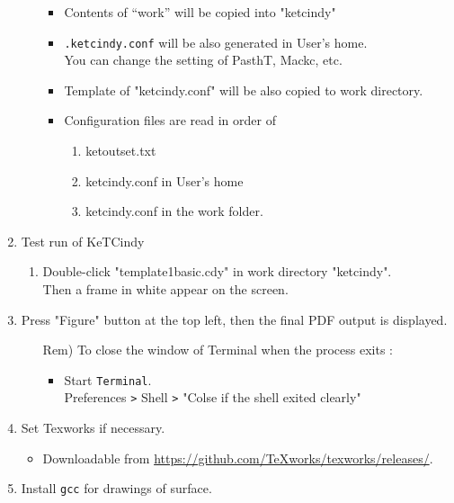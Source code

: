 \documentclass{article}
\begin{document}
\begin{enumerate}[\bf\large 1.]
\begin{enumerate}[(1)]
\begin{itemize}
    \item Contents of “work” will be copied into "ketcindy"
    \item \verb|.ketcindy.conf| will be also generated in User's home.\\
    \hspace*{10mm}You can change the setting of PasthT, Mackc, etc.
    \item Template of "ketcindy.conf" will be also copied to work directory.
    \item Configuration files are read in order of 
      \begin{enumerate}[1)]
      \item ketoutset.txt
      \item ketcindy.conf in User's home
      \item ketcindy.conf in the work folder.
      \end{enumerate}
    \end{itemize}
  \end{enumerate}

\item Test run of KeTCindy
 \begin{enumerate}[(1)]
  \item Double-click "template1basic.cdy" in work directory "ketcindy".\\
  \hspace*{10mm}Then a frame in white appear on the screen.  \end{enumerate}
  \item Press "Figure" button at the top left, then the final PDF output is displayed. 
    \begin{itemize}
    \item[Rem)]To close the window of Terminal when the process exits :
      \begin{itemize}
      \item Start \verb|Terminal|.\\
      \hspace*{10mm}Preferences \verb|>| Shell \verb|>| "Colse if the shell exited clearly"
      \end{itemize}
    \end{itemize} 

\item Set Texworks if necessary. 
  \begin{itemize}
  \item Downloadable from \url{https://github.com/TeXworks/texworks/releases/}.
  \end{itemize}

\item Install \verb|gcc| for drawings of surface.

\end{enumerate}
\end{document}
